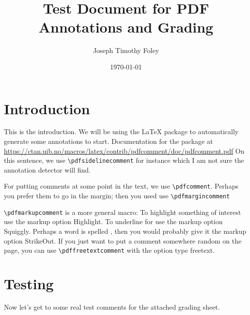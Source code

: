 \documentclass[11pt,a4paper]{article}
\title{Test Document for PDF Annotations and Grading}
\author{Joseph Timothy Foley}
\date{\today}
\begin{document}
\maketitle{}
\newcommand{\texmacro}[1]{\texttt{\textbackslash#1}}
\section{Introduction}
This is the introduction.
We will be using the  \LaTeX{} package to automatically generate some annotations to start.
Documentation for the package at \url{https://ctan.uib.no/macros/latex/contrib/pdfcomment/doc/pdfcomment.pdf}
On this sentence, we use \texmacro{pdfsidelinecomment} for instance which I am not sure the annotation detector will find.

For putting comments at some point in the text, we use \texmacro{pdfcomment}.
Perhaps you prefer them to go in the margin; then you used use \texmacro{pdfmargincomment}

\texmacro{pdfmarkupcomment} is a more general macro:
To highlight something of interest  use the markup option Highlight.
To underline for  use the markup option Squiggly.
Perhaps a word is spelled , then you would probably give it the markup option StrikeOut.
If you just want to put a comment somewhere random on the page, you can use \texmacro{pdffreetextcomment} with the option type freetext. 

\section{Testing}
Now let's get to some real test comments for the attached grading sheet.
\end{document}
